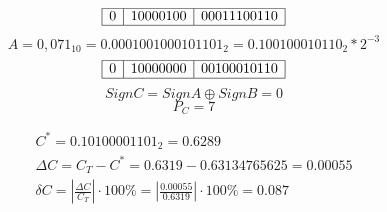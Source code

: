 \documentclass{article}
\begin{document}
\begin{enumerate}
$$\begin{array}{|c|c|c|}
                            \hline        
                            0 & 10000100 & 00011100110 \\\hline
                     \end{array}
              $$
              $$ A = 0,071_{10} = 0.0001001000101101_{2} = 0.100100010110_{2} * 2^{-3} $$
              $$
                     \begin{array}{|c|c|c|}
                            \hline        
                            0 & 10000000 & 00100010110 \\\hline
                     \end{array}
              $$
              $$ SignC = SignA \oplus SignB = 0 $$
              $$ P_C = 7 $$
              
              $$
                     \begin{array}{c}
                            C^* = 0.10100001101_{2}  = 0.6289\\
                            \Delta C = C_T - C^* = 0.6319 - 0.63134765625 = 0.00055 \\
                            \delta C = \left|\frac{\Delta C}{C_T}\right| \cdot 100\% = \left|\frac{0.00055}{0.6319}\right| \cdot 100\% = 0.087 \\
                     \end{array}
              $$
\end{enumerate}
\end{document}
